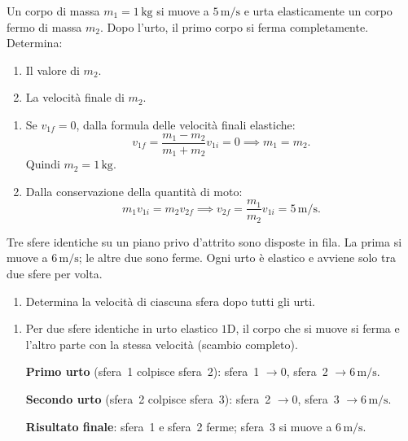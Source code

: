 \begin{question}[ID=2.3, subtitle={Determinazione della massa in un urto elastico}, tags={urti elastici, riflessione}, difficulty=difficile]
Un corpo di massa \(m_1 = 1 \, \text{kg}\) si muove a \(5 \, \text{m/s}\) e urta elasticamente un corpo fermo di massa \(m_2\). Dopo l'urto, il primo corpo si ferma completamente. Determina:
\begin{enumerate}
    \item Il valore di \(m_2\).
    \item La velocità finale di \(m_2\).
\end{enumerate}
\begin{solution}
    \begin{enumerate}
        \item Se \(v_{1f} = 0\), dalla formula delle velocità finali elastiche:
        \[
            v_{1f} = \frac{m_1 - m_2}{m_1 + m_2} v_{1i} = 0 \implies m_1 = m_2.
        \]
        Quindi \(m_2 = 1 \, \text{kg}\).
        \item Dalla conservazione della quantità di moto:
        \[
            m_1 v_{1i} = m_2 v_{2f} \implies v_{2f} = \frac{m_1}{m_2} v_{1i} = 5 \, \text{m/s}.
        \]
    \end{enumerate}
\end{solution}
\end{question}


\begin{question}[ID=2.4, subtitle={Urti elastici sequenziali tra tre sfere identiche}, tags={urti elastici, energia, sistema a tre corpi}, difficulty=difficile]
Tre sfere identiche su un piano privo d'attrito sono disposte in fila. La prima si muove a \(6 \, \text{m/s}\); le altre due sono ferme. Ogni urto è elastico e avviene solo tra due sfere per volta.
\begin{enumerate}
    \item Determina la velocità di ciascuna sfera dopo tutti gli urti.
\end{enumerate}
\begin{solution}
    \begin{enumerate}
        \item Per due sfere identiche in urto elastico \(1\)D, il corpo che si muove si ferma e l'altro parte con la stessa velocità (scambio completo).

        \textbf{Primo urto} (sfera~1 colpisce sfera~2):
        sfera~1 \(\to 0\), sfera~2 \(\to 6 \, \text{m/s}\).

        \textbf{Secondo urto} (sfera~2 colpisce sfera~3):
        sfera~2 \(\to 0\), sfera~3 \(\to 6 \, \text{m/s}\).

        \textbf{Risultato finale}: sfera~1 e sfera~2 ferme; sfera~3 si muove a \(6 \, \text{m/s}\).
    \end{enumerate}
\end{solution}
\end{question}

